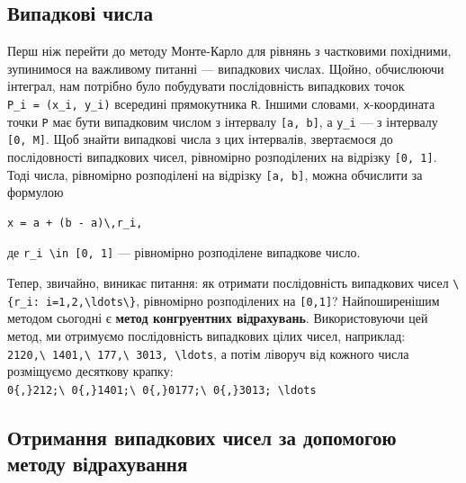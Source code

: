 \documentclass[
  ukrainian,
]{article}
\begin{document}
\subsection{Випадкові
числа}\label{ux432ux438ux43fux430ux434ux43aux43eux432ux456-ux447ux438ux441ux43bux430}

Перш ніж перейти до методу Монте-Карло для рівнянь з частковими
похідними, зупинимося на важливому питанні --- випадкових числах. Щойно,
обчислюючи інтеграл, нам потрібно було побудувати послідовність
випадкових точок \texttt{P\_i\ =\ (x\_i,\ y\_i)} всередині прямокутника
\texttt{R}. Іншими словами, \texttt{x}-координата точки \texttt{P} має
бути випадковим числом з інтервалу \texttt{{[}a,\ b{]}}, а \texttt{y\_i}
--- з інтервалу \texttt{{[}0,\ M{]}}. Щоб знайти випадкові числа з цих
інтервалів, звертаємося до послідовності випадкових чисел, рівномірно
розподілених на відрізку \texttt{{[}0,\ 1{]}}. Тоді числа, рівномірно
розподілені на відрізку \texttt{{[}a,\ b{]}}, можна обчислити за
формулою

\begin{verbatim}
x = a + (b - a)\,r_i,
\end{verbatim}

де \texttt{r\_i\ \textbackslash{}in\ {[}0,\ 1{]}} --- рівномірно
розподілене випадкове число.

Тепер, звичайно, виникає питання: як отримати послідовність випадкових
чисел
\texttt{\textbackslash{}\{r\_i:\ i=1,2,\textbackslash{}ldots\textbackslash{}\}},
рівномірно розподілених на \texttt{{[}0,1{]}}? Найпоширенішим методом
сьогодні є \textbf{метод конгруентних відрахувань}. Використовуючи цей
метод, ми отримуємо послідовність випадкових цілих чисел, наприклад:
\texttt{2120,\textbackslash{}\ 1401,\textbackslash{}\ 177,\textbackslash{}\ 3013,\ \textbackslash{}ldots},
а потім ліворуч від кожного числа розміщуємо десяткову крапку:
\texttt{0\{,\}212;\textbackslash{}\ 0\{,\}1401;\textbackslash{}\ 0\{,\}0177;\textbackslash{}\ 0\{,\}3013;\ \textbackslash{}ldots}

\subsection{Отримання випадкових чисел за допомогою методу
відрахування}\label{ux43eux442ux440ux438ux43cux430ux43dux43dux44f-ux432ux438ux43fux430ux434ux43aux43eux432ux438ux445-ux447ux438ux441ux435ux43b-ux437ux430-ux434ux43eux43fux43eux43cux43eux433ux43eux44e-ux43cux435ux442ux43eux434ux443-ux432ux456ux434ux440ux430ux445ux443ux432ux430ux43dux43dux44f}
\end{document}

